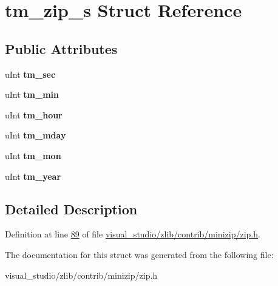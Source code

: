 \hypertarget{structtm__zip__s}{}\section{tm\+\_\+zip\+\_\+s Struct Reference}
\label{structtm__zip__s}
\subsection*{Public Attributes}
\begin{DoxyCompactItemize}
\item 
\mbox{\label{structtm__zip__s_adf073cb37484b209d7f7f0e23275a52d}} 
u\+Int {\bfseries tm\+\_\+sec}
\item 
\mbox{\label{structtm__zip__s_ad539676c1522e9f2cb77cb9e65795e2a}} 
u\+Int {\bfseries tm\+\_\+min}
\item 
\mbox{\label{structtm__zip__s_abfde1cc7378be65b4b23e1488e9bd279}} 
u\+Int {\bfseries tm\+\_\+hour}
\item 
\mbox{\label{structtm__zip__s_aebc461dd0a4a7b7ebd4e00de5fbf594d}} 
u\+Int {\bfseries tm\+\_\+mday}
\item 
\mbox{\label{structtm__zip__s_ae98d11f7e2b2330b3a83efe97ffef574}} 
u\+Int {\bfseries tm\+\_\+mon}
\item 
\mbox{\label{structtm__zip__s_ad58d60c6a536a0861dec11c6ef270753}} 
u\+Int {\bfseries tm\+\_\+year}
\end{DoxyCompactItemize}


\subsection{Detailed Description}


Definition at line \hyperlink{visual__studio_2zlib_2contrib_2minizip_2zip_8h_source_l00089}{89} of file \hyperlink{visual__studio_2zlib_2contrib_2minizip_2zip_8h_source}{visual\+\_\+studio/zlib/contrib/minizip/zip.\+h}.



The documentation for this struct was generated from the following file\+:\begin{DoxyCompactItemize}
\item 
visual\+\_\+studio/zlib/contrib/minizip/zip.\+h\end{DoxyCompactItemize}
